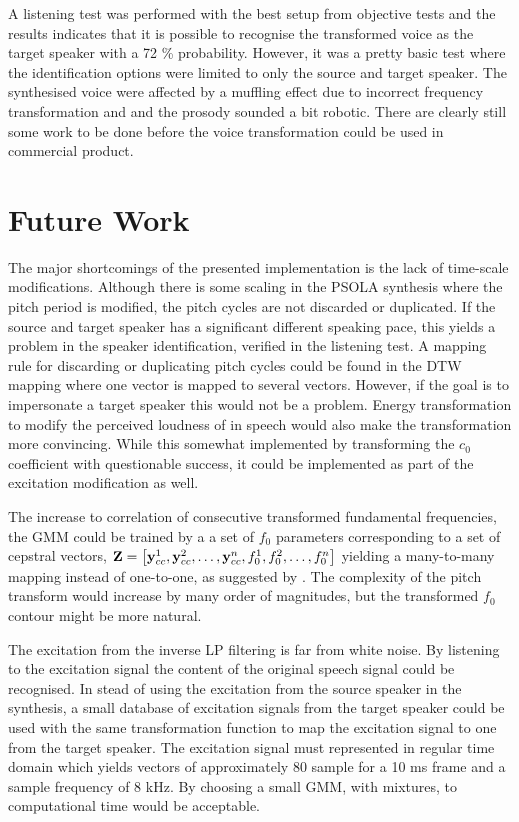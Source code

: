 A listening test was performed with the best setup from objective tests and the results indicates that it is possible to recognise the transformed voice as the target speaker with a 72 \% probability. However, it was a pretty basic test where the identification options were limited to only the source and target speaker. The synthesised voice were affected by a muffling effect due to incorrect frequency transformation and and the prosody sounded a bit robotic. There are clearly still some work to be done before the voice transformation could be used in commercial product.


\section{Future Work} %
\label{sec:future_work}

The major shortcomings of the presented implementation is the lack of time-scale modifications. Although there is some scaling in the PSOLA synthesis where the pitch period is modified, the pitch cycles are not discarded or duplicated. If the source and target speaker has a significant different speaking pace, this yields a problem in the speaker identification, verified in the listening test. A mapping rule for discarding or duplicating pitch cycles could be found in the DTW mapping where one vector is mapped to several vectors. However, if the goal is to impersonate a target speaker this would not be a problem. Energy transformation to modify the perceived loudness of in speech would also make the transformation more convincing. While this somewhat implemented by transforming the $c_0$ coefficient with questionable success, it could be implemented as part of the excitation modification as well. 

The increase to correlation of consecutive transformed fundamental frequencies, the GMM could be trained by a a set of $f_0$ parameters corresponding to a set of cepstral vectors, $\mathbf{Z}=\left[\mathbf{y}_{cc}^1,\mathbf{y}_{cc}^2,\dotsc,\mathbf{y}_{cc}^n,f_{0}^1,f_{0}^2,\dotsc,f_{0}^n\right]$ yielding a many-to-many mapping instead of one-to-one, as suggested by \cite{najjary04}. The complexity of the pitch transform would increase by many order of magnitudes, but the transformed $f_0$ contour might be more natural.

The excitation from the inverse LP filtering is far from white noise. By listening to the excitation signal the content of the original speech signal could be recognised. In stead of using the excitation from the source speaker in the synthesis, a small database of excitation signals from the target speaker could be used with the same transformation function to map the excitation signal to one from the target speaker. The excitation signal must represented in regular time domain which yields vectors of approximately 80 sample for a 10 ms frame and a sample frequency of 8 kHz. By choosing a small GMM, with  mixtures, to computational time would be acceptable.

